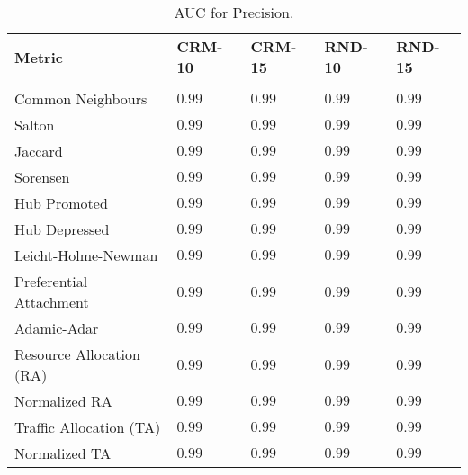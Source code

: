 \lipsum[1]

    \begin{table}[h]
		\centering
		\begin{tabular}{l l l l l}
		\toprule
		\textbf{Metric} & \textbf{CRM-10} & \textbf{CRM-15} & \textbf{RND-10} & \textbf{RND-15}\\\\
		\midrule
			Common Neighbours & $0.99$ & $0.99$ & $0.99$ & $0.99$ \\
			Salton  & $0.99$ & $0.99$ & $0.99$ & $0.99$ \\
			Jaccard  & $0.99$ & $0.99$ & $0.99$ & $0.99$ \\
			Sorensen   & $0.99$ & $0.99$ & $0.99$ & $0.99$ \\
			Hub Promoted  & $0.99$ & $0.99$ & $0.99$ & $0.99$ \\
			Hub Depressed  & $0.99$ & $0.99$ & $0.99$ & $0.99$ \\
			Leicht-Holme-Newman  & $0.99$ & $0.99$ & $0.99$ & $0.99$ \\
			Preferential Attachment  & $0.99$ & $0.99$ & $0.99$ & $0.99$ \\
			Adamic-Adar  & $0.99$ & $0.99$ & $0.99$ & $0.99$ \\
			Resource Allocation (RA)  & $0.99$ & $0.99$ & $0.99$ & $0.99$ \\
			Normalized RA  & $0.99$ & $0.99$ & $0.99$ & $0.99$ \\
			Traffic Allocation (TA)  & $0.99$ & $0.99$ & $0.99$ & $0.99$ \\
			Normalized TA  & $0.99$ & $0.99$ & $0.99$ & $0.99$ \\
		\bottomrule
		\end{tabular}
		\label{tab:attenuazione}
		\caption{AUC for Precision.}
	\end{table}	

     


